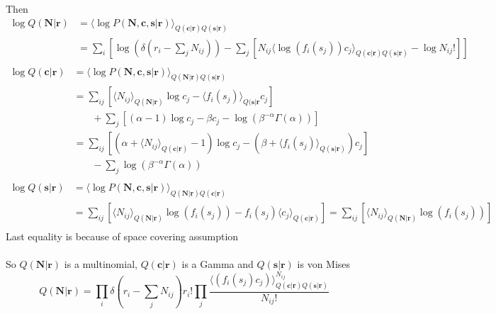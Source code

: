 \documentclass[12pt]{article}
\begin{document}
Then
\begin{equation}
\begin{aligned}
\log Q(\mathbf{N|r}) &= \langle \log P(\mathbf{N, c, s|r}) \rangle_{Q(\mathbf{c|r})Q(\mathbf{s|r})}\\
&= \sum_i [\log(\delta(r_i - \sum_j N_{ij})) - \sum_j [N_{ij} \langle \log(f_i (s_j)) c_j \rangle_{Q(\mathbf{c|r})Q(\mathbf{s|r})} - \log N_{ij}!]]\\
\end{aligned}
\end{equation}
\begin{equation}
\begin{aligned}
\log Q(\mathbf{c|r}) &= \langle \log P(\mathbf{N, c, s|r}) \rangle_{Q(\mathbf{N|r})Q(\mathbf{s|r})}\\
&= \sum_{ij} [\langle N_{ij} \rangle_{Q(\mathbf{N|r})} \log c_j - \langle f_i (s_j)\rangle_{Q(\mathbf{s|r}}c_j]\\
& \phantom{{}=1}+ \sum_j [(\alpha - 1) \log c_j - \beta c_j - \log (\beta^{- \alpha} \Gamma (\alpha))]\\
&= \sum_{ij} [(\alpha + \langle N_{ij} \rangle_{Q(\mathbf{c|r})} - 1) \log c_j - (\beta + \langle f_i (s_j)\rangle_{Q(\mathbf{s|r})}) c_j]\\
& \phantom{{}=1}- \sum_j \log (\beta^{- \alpha} \Gamma (\alpha))\\
\end{aligned}
\end{equation}
\begin{equation}
\begin{aligned}
\log Q(\mathbf{s|r}) &= \langle \log P(\mathbf{N, c, s|r}) \rangle_{Q(\mathbf{N|r})Q(\mathbf{c|r})}\\
&= \sum_{ij} [\langle N_{ij} \rangle_{Q(\mathbf{N|r})} \log(f_i(s_j)) - f_i(s_j) \langle c_j \rangle_{Q(\mathbf{c|r})}] = \sum_{ij} [\langle N_{ij} \rangle_{Q(\mathbf{N|r})} \log(f_i(s_j))]\\
\end{aligned}
\end{equation}
Last equality is because of space covering assumption\\
\\
So $Q(\mathbf{N|r})$ is a multinomial, $Q(\mathbf{c|r})$ is a Gamma and $Q(\mathbf{s|r})$ is von Mises\\
\begin{equation}
Q(\mathbf{N|r}) = \prod_i \delta(r_i - \sum_j N_{ij}) r_i! \prod_j \frac{\langle (f_i (s_j) c_j) \rangle_{Q(\mathbf{c|r})Q(\mathbf{s|r})}^{N_{ij}}}{N_{ij}!}
\end{equation}
\end{document}
